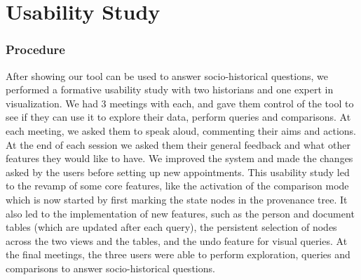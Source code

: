 




\section{Usability Study}\label{sec:usability}

\subsubsection{Procedure}

After showing our tool can be used to answer socio-historical questions, we performed a formative usability study with two historians and one expert in visualization. We had 3 meetings with each, and gave them control of the tool to see if they can use it to explore their data, perform queries and comparisons. At each meeting, we asked them to speak aloud, commenting their aims and actions. At the end of each session we asked them their general feedback and what other features they would like to have. We improved the system and made the changes asked by the users before setting up new appointments. This usability study led to the revamp of some core features, like the activation of the comparison mode which is now started by first marking the state nodes in the provenance tree. It also led to the implementation of new features, such as the person and document tables (which are updated after each query), the persistent selection of nodes across the two views and the tables, and the undo feature for visual queries.
At the final meetings, the three users were able to perform exploration, queries and comparisons to answer socio-historical questions.

